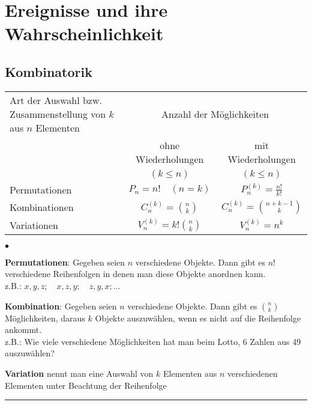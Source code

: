\section{Ereignisse und ihre Wahrscheinlichkeit}
	\subsection{Kombinatorik }
		\begin{tabular}{| p{5.5cm} | c | c |}
			\hline
			Art der Auswahl bzw. Zusammenstellung von $k$ aus $n$ Elementen
			& \multicolumn{2}{|c|}{Anzahl der Möglichkeiten}\\
 			& ohne Wiederholungen		& mit Wiederholungen\\
 			& $(k\leq n)$ 				& $(k\leq n)$ \\
 			\hline
 			Permutationen & $P_n=n!\quad(n=k)$ &	$P_n^{(k)}=\frac{n!}{k!}$ \\
 			Kombinationen & $C_n^{(k)}=\binom n k$ & $C_n^{(k)}=\binom{n+k-1} k$ \\
 			Variationen & $V_n^{(k)}=k!\binom n k$ & $V_n^{(k)}=n^k$\\
 			\hline
		\end{tabular}
		
		\begin{list}{$\bullet$}{\setlength{\itemsep}{0cm} \setlength{\parsep}{0cm} \setlength{\topsep}{0.1cm}} 
         	\item \textbf{Permutationen}: Gegeben seien $n$ verschiedene Objekte. Dann gibt es $n!$
         	verschiedene Reihenfolgen in denen man diese Objekte anordnen
         	kann. \\
         	z.B.: $x,y,z;\quad x,z,y;\quad z,y,x;\ldots$
		 	\item \textbf{Kombination}: Gegeben seien $n$ verschiedene Objekte. Dann gibt es $\binom n k$
		 	Möglichkeiten, daraus $k$ Objekte auszuwählen, wenn es nicht auf die Reihenfolge
		 	ankommt. \\
		 	z.B.: Wie viele verschiedene Möglichkeiten hat man beim Lotto, 6 Zahlen aus 49
		 	auszuwählen?
		  \item \textbf{Variation} nennt man eine Auswahl von $k$ Elementen aus $n$
		  		verschiedenen Elementen unter Beachtung der Reihenfolge
        \end{list}
\hrule

